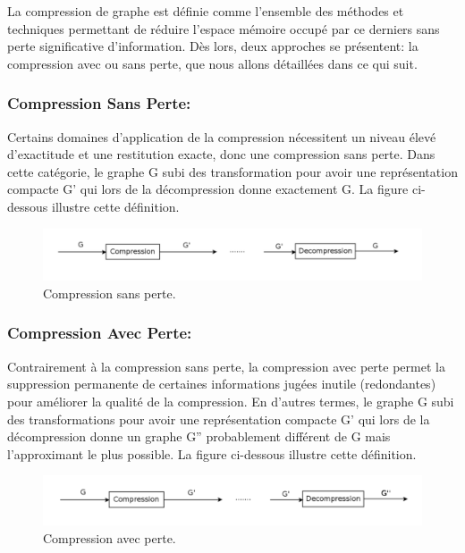 La compression de graphe est définie comme l'ensemble des méthodes et techniques permettant de réduire l'espace mémoire occupé par ce derniers sans perte significative d'information. Dès lors, deux approches se présentent: la compression avec ou sans perte, que nous allons détaillées dans ce qui suit.
			
			\subsubsection{Compression Sans Perte:}
			Certains domaines d'application de la compression nécessitent un niveau élevé d'exactitude et une restitution exacte, donc une compression sans perte. Dans cette catégorie, le graphe G subi des transformation pour avoir une représentation compacte G' qui lors de la décompression donne exactement G. La figure ci-dessous illustre cette définition. 
			
			\begin{figure}[h]
			\includegraphics[scale=0.15,center]{./ressources/image/SansPerte.png}
			\caption[Compression sans perte.]{Compression sans perte.}
			\end{figure}
			
			
			\subsubsection{Compression Avec Perte:}
			Contrairement à la compression sans perte, la compression avec perte permet la suppression permanente de certaines informations jugées inutile (redondantes) pour améliorer la qualité de la compression.  En d'autres termes, le graphe G subi des transformations pour avoir une représentation compacte G' qui lors de la décompression donne un graphe G'' probablement différent de G mais l'approximant le plus possible. La figure ci-dessous illustre cette définition.   
			
			\begin{figure}[h]
			\includegraphics[scale=0.15,center]{./ressources/image/AvecPerte.png}
			\caption[Compression avec perte.]{Compression avec perte.}
			\end{figure}
			
